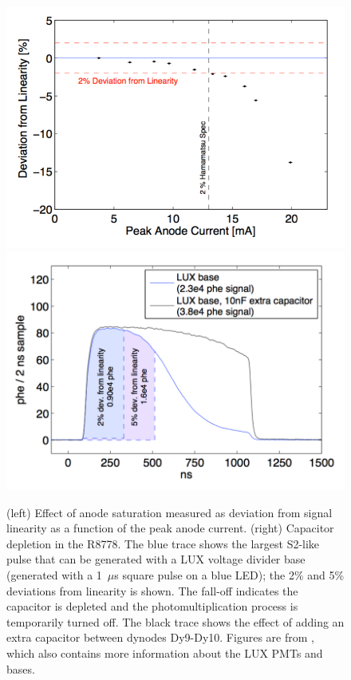 \begin{figure}[htbp]
\begin{center}
\includegraphics[width=\halffig]{figures/etrains/anode_saturation.png}
\includegraphics[width=\halffig]{figures/etrains/capacitor_depletion.png}
\caption{(left) Effect of anode saturation measured as deviation from signal linearity as a function of the peak anode current. (right) Capacitor depletion in the R8778. The blue trace shows the largest S2-like pulse that can be generated with a \ac{LUX} voltage divider base (generated with a 1~$\mu$s square pulse on a blue LED); the 2\% and 5\% deviations from linearity is shown. The fall-off indicates the capacitor is depleted and the photomultiplication process is temporarily turned off. The black trace shows the effect of adding an extra capacitor between dynodes Dy9-Dy10. Figures are from \cite{Faham2014a}, which also contains more information about the \ac{LUX} \ac{PMT}s and bases. }
\label{fig:pmt_saturation_plots}
\end{center}
\end{figure}

